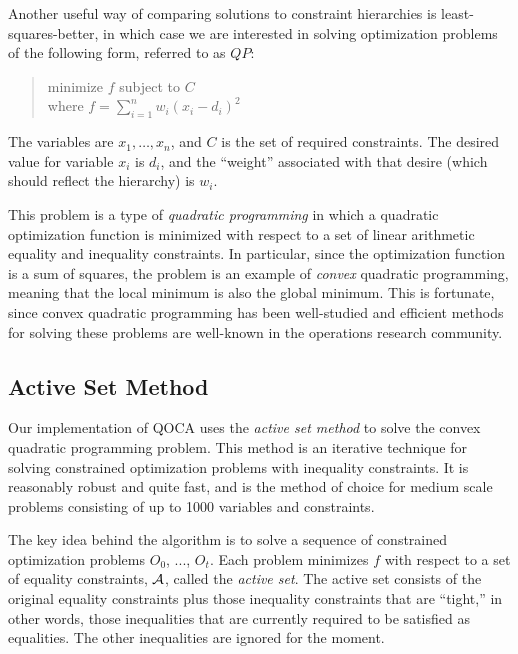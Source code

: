 \documentclass{uist96}
\begin{document}
Another useful way of comparing solutions to constraint hierarchies is
least-squares-better, in which case we are interested in
solving optimization problems of the following form, referred to as $QP$:
\begin{quote}
minimize $f$ subject to $C$  \\
where $f = \sum_{i=1}^n w_i (x_i - d_i)^2$
\end{quote}\vspace{-0.9ex}
The variables are $x_1, \ldots , x_n$, and $C$  is the set of
required constraints.  The desired value for variable
$x_i$ is $d_i$, and the ``weight'' associated with that desire (which
should reflect the hierarchy) is $w_i$\@.

This problem is a type of {\em quadratic programming} in which a quadratic
optimization function is minimized with respect to a set of linear
arithmetic equality and inequality constraints.  In particular, since the
optimization function is a sum of squares, the problem is an example
of {\em convex} quadratic programming, meaning that the local minimum is
also the global minimum.  This is fortunate, since convex quadratic
programming has been well-studied and efficient methods for solving these
problems are well-known in the operations research community.

\subsection{Active Set Method}
\label{active-sets}

Our implementation of QOCA uses the {\em active set method}
\cite{fletcher-book} to solve the convex quadratic programming problem.
This method is an iterative technique for solving constrained optimization
problems with inequality constraints.  It is reasonably robust and quite
fast, and is the method of choice for medium scale problems consisting of
up to 1000 variables and constraints.

The key idea behind the algorithm is to solve a sequence of constrained
optimization problems $O_0$, ..., $O_t$\@.  
Each problem minimizes $f$ with
respect to a set of equality constraints, ${\cal A}$, called the {\em
active set}.  The active set consists of the original equality constraints
plus those inequality constraints that are ``tight,'' in other words, those
inequalities that are currently required to be satisfied as
equalities. The other inequalities are ignored for the moment.

\end{document}
